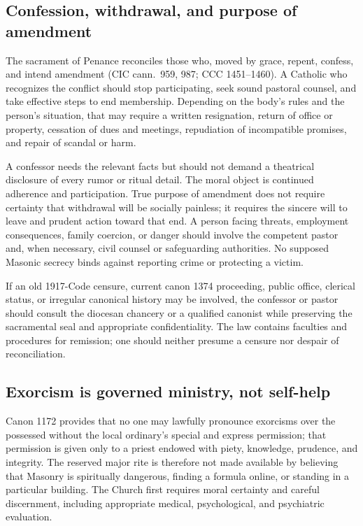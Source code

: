 \subsection{Confession, withdrawal, and purpose of amendment}

The sacrament of Penance reconciles those who, moved by grace, repent, confess, and intend amendment (CIC cann.~959, 987; CCC 1451--1460). A Catholic who recognizes the conflict should stop participating, seek sound pastoral counsel, and take effective steps to end membership. Depending on the body's rules and the person's situation, that may require a written resignation, return of office or property, cessation of dues and meetings, repudiation of incompatible promises, and repair of scandal or harm.

A confessor needs the relevant facts but should not demand a theatrical disclosure of every rumor or ritual detail. The moral object is continued adherence and participation. True purpose of amendment does not require certainty that withdrawal will be socially painless; it requires the sincere will to leave and prudent action toward that end. A person facing threats, employment consequences, family coercion, or danger should involve the competent pastor and, when necessary, civil counsel or safeguarding authorities. No supposed Masonic secrecy binds against reporting crime or protecting a victim.

\enlargethispage{\baselineskip}
If an old 1917-Code censure, current canon 1374 proceeding, public office, clerical status, or irregular canonical history may be involved, the confessor or pastor should consult the diocesan chancery or a qualified canonist while preserving the sacramental seal and appropriate confidentiality. The law contains faculties and procedures for remission; one should neither presume a censure nor despair of reconciliation.

\subsection{Exorcism is governed ministry, not self-help}

Canon 1172 provides that no one may lawfully pronounce exorcisms over the possessed without the local ordinary's special and express permission; that permission is given only to a priest endowed with piety, knowledge, prudence, and integrity. The reserved major rite is therefore not made available by believing that Masonry is spiritually dangerous, finding a formula online, or standing in a particular building. The Church first requires moral certainty and careful discernment, including appropriate medical, psychological, and psychiatric evaluation.


